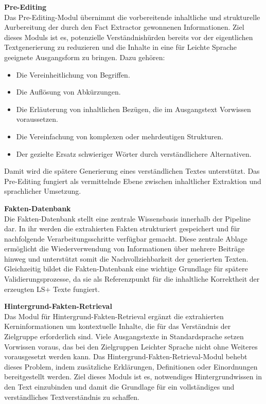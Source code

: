 \textbf{Pre-Editing}\\
Das Pre-Editing-Modul übernimmt die vorbereitende inhaltliche und strukturelle Aurbereitung der durch den Fact Extractor gewonnenen Informationen.
Ziel dieses Moduls ist es, potenzielle Verständnishürden bereits vor der eigentlichen Textgenerierung zu reduzieren und die Inhalte in eine für Leichte Sprache geeignete Ausgangsform zu bringen.
Dazu gehören:
\begin{itemize}[label=\textbullet, nosep]
	\item Die Vereinheitlichung von Begriffen.
	\item Die Auflösung von Abkürzungen.
	\item Die Erläuterung von inhaltlichen Bezügen, die im Ausgangstext Vorwissen voraussetzen.
	\item Die Vereinfachung von komplexen oder mehrdeutigen Strukturen.
	\item Der gezielte Ersatz schwieriger Wörter durch verständlichere Alternativen.
\end{itemize}
Damit wird die spätere Generierung eines verständlichen Textes unterstützt.
Das Pre-Editing fungiert als vermittelnde Ebene zwischen inhaltlicher Extraktion und sprachlicher Umsetzung.

\textbf{Fakten-Datenbank}\\
Die Fakten-Datenbank stellt eine zentrale Wissensbasis innerhalb der Pipeline dar.
In ihr werden die extrahierten Fakten strukturiert gespeichert und für nachfolgende Verarbeitungsschritte verfügbar gemacht.
Diese zentrale Ablage ermöglicht die Wiederverwendung von Informationen über mehrere Beiträge hinweg und unterstützt somit die Nachvollziehbarkeit der generierten Texten.
Gleichzeitig bildet die Fakten-Datenbank eine wichtige Grundlage für spätere Validierungsprozesse, da sie als Referenzpunkt für die inhaltliche Korrektheit der erzeugten LS+ Texte fungiert.

\textbf{Hintergrund-Fakten-Retrieval}\\
Das Modul für Hintergrund-Fakten-Retrieval ergänzt die extrahierten Kerninformationen um kontextuelle Inhalte, die für das Verständnis der Zielgruppe erforderlich sind.
Viele Ausgangstexte in Standardsprache setzen Vorwissen voraus, das bei den Zielgruppen Leichter Sprache nicht ohne Weiteres vorausgesetzt werden kann.
Das Hintergrund-Fakten-Retrieval-Modul behebt dieses Problem, indem zusätzliche Erklärungen, Definitionen oder Einordnungen bereitgestellt werden.
Ziel dieses Moduls ist es, notwendiges Hintergrundwissen in den Text einzubinden und damit die Grundlage für ein vollständiges und verständliches Textverständnis zu schaffen.

